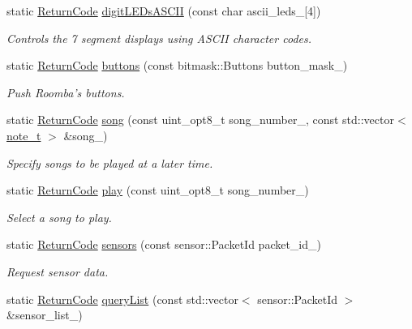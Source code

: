 \begin{DoxyCompactItemize}
static \hyperlink{namespaceroomba_aff53babe0af88b1ea8b066fd18b8f23f}{Return\+Code} \hyperlink{classroomba_1_1_open_interface_ac6a6cba0c5ed78c9d40bb204837103d2}{digit\+L\+E\+Ds\+A\+S\+C\+I\+I} (const char ascii\+\_\+leds\+\_\+\mbox{[}4\mbox{]})
\begin{DoxyCompactList}\small\item\em Controls the 7 segment displays using A\+S\+C\+I\+I character codes. \end{DoxyCompactList}\item 
static \hyperlink{namespaceroomba_aff53babe0af88b1ea8b066fd18b8f23f}{Return\+Code} \hyperlink{classroomba_1_1_open_interface_aee99c140a58f2eb7875c4a8bb4c4a7d3}{buttons} (const bitmask\+::\+Buttons button\+\_\+mask\+\_\+)
\begin{DoxyCompactList}\small\item\em Push Roomba’s buttons. \end{DoxyCompactList}\item 
static \hyperlink{namespaceroomba_aff53babe0af88b1ea8b066fd18b8f23f}{Return\+Code} \hyperlink{classroomba_1_1_open_interface_af0ff902d78729ee84c3a918c0fed5226}{song} (const uint\+\_\+opt8\+\_\+t song\+\_\+number\+\_\+, const std\+::vector$<$ \hyperlink{namespaceroomba_a19e8ac8a2208a1a44fa9273930cf7451}{note\+\_\+t} $>$ \&song\+\_\+)
\begin{DoxyCompactList}\small\item\em Specify songs to be played at a later time. \end{DoxyCompactList}\item 
static \hyperlink{namespaceroomba_aff53babe0af88b1ea8b066fd18b8f23f}{Return\+Code} \hyperlink{classroomba_1_1_open_interface_ae37e55670f5be0b618b5db1ee886bff7}{play} (const uint\+\_\+opt8\+\_\+t song\+\_\+number\+\_\+)
\begin{DoxyCompactList}\small\item\em Select a song to play. \end{DoxyCompactList}\item 
static \hyperlink{namespaceroomba_aff53babe0af88b1ea8b066fd18b8f23f}{Return\+Code} \hyperlink{classroomba_1_1_open_interface_aa676703a4c79547397eaa89ddb9e207c}{sensors} (const sensor\+::\+Packet\+Id packet\+\_\+id\+\_\+)
\begin{DoxyCompactList}\small\item\em Request sensor data. \end{DoxyCompactList}\item 
static \hyperlink{namespaceroomba_aff53babe0af88b1ea8b066fd18b8f23f}{Return\+Code} \hyperlink{classroomba_1_1_open_interface_a4a7308a7119c6a462389d9ffa3785f87}{query\+List} (const std\+::vector$<$ sensor\+::\+Packet\+Id $>$ \&sensor\+\_\+list\+\_\+)

\end{DoxyCompactItemize}
